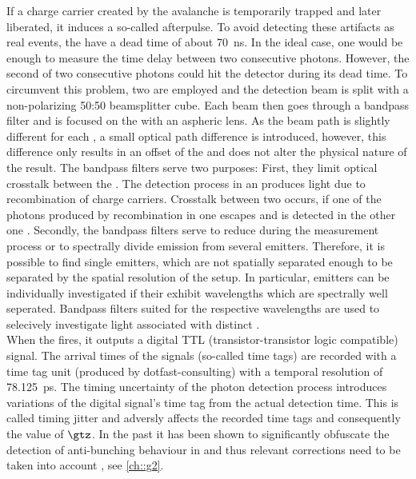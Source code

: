 		If a charge carrier created by the avalanche is temporarily trapped and later liberated, it induces a so-called afterpulse.
		To avoid detecting these artifacts as real events, the \APDs have a dead time of about \SI{70}{\ns}.
		In the ideal case, one \APD would be enough to measure the time delay between two consecutive photons.
		However, the second of two consecutive photons could hit the detector during its dead time.
		To circumvent this problem, two \APDs are employed and the detection beam is split with a non-polarizing 50:50 beamsplitter cube.
		Each beam then goes through a bandpass filter and is focused on the \apd with an aspheric lens.
		As the beam path is slightly different for each \APD, a small optical path difference is introduced, however, this difference only results in an offset of the \gtf and does not alter the physical nature of the result.
		The bandpass filters serve two purposes:
		First, they limit optical crosstalk between the \apds.
		The detection process in an \apd produces light due to recombination of charge carriers.
		Crosstalk between two \apds occurs, if one of the photons produced by recombination in one \apd escapes and is detected in the other one \cite{Younger2009}.
		Secondly, the bandpass filters serve to reduce \bkg during the \gt measurement process or to spectrally divide emission from several emitters.
		Therefore, it is possible to find single emitters, which are not spatially separated enough to be separated by the spatial resolution of the setup.
		In particular, emitters can be individually investigated if their \ZPLs exhibit wavelengths which are spectrally well seperated.
		Bandpass filters suited for the respective wavelengths are used to selecively investigate light associated with distinct \ZPLs.
		\\
		When the \APD fires, it outputs a digital TTL (transistor-transistor logic compatible) signal.
		The arrival times of the signals (so-called time tags) are recorded with a time tag unit (produced by dotfast-consulting) with a temporal resolution of \SI{78.125}{\pico\second}.
		The timing uncertainty of the photon detection process introduces variations of the digital signal's time tag from the actual detection time.
		This is called timing jitter and adversly affects the recorded time tags and consequently the value of $\gtz$. In the past it has been shown to significantly obfuscate the detection of anti-bunching behaviour in \sps and thus relevant corrections need to be taken into account \cite{neu::thesis, janine::thesis}, see \autoref{ch::g2}.
		\\
